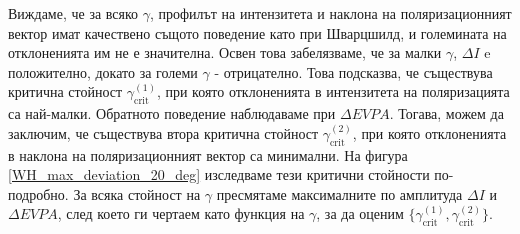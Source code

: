 Виждаме, че за всяко $\gamma$, профилът на интензитета и наклона на поляризационният вектор имат качествено същото поведение като при Шварцшилд, и големината на отклоненията им не е значителна. Освен това забелязваме, че за малки $\gamma$, $\Delta I$ e положително, докато за големи $\gamma$ - отрицателно. Това подсказва, че съществува критична стойност $\gamma_\text{crit}^{(1)}$, при която отклоненията в интензитета на поляризацията са най-малки. Обратното поведение наблюдаваме при $\Delta EVPA$. Тогава, можем да заключим, че съществува втора критична стойност $\gamma_\text{crit}^{(2)}$, при която отклоненията в наклона на поляризационният вектор са минимални. На фигура \ref{WH_max_deviation_20_deg} изследваме тези критични стойности по-подробно. За всяка стойност на $\gamma$ пресмятаме максималните по амплитуда $\Delta I$ и $\Delta EVPA$, след което ги чертаем като функция на $\gamma$, за да оценим $\{\gamma_\text{crit}^{(1)}, \gamma_\text{crit}^{(2)}\}$.

